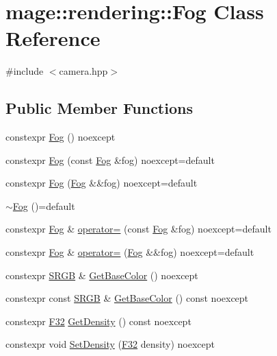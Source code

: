 \hypertarget{classmage_1_1rendering_1_1_fog}{}\section{mage\+:\+:rendering\+:\+:Fog Class Reference}
\label{classmage_1_1rendering_1_1_fog}


{\ttfamily \#include $<$camera.\+hpp$>$}

\subsection*{Public Member Functions}
\begin{DoxyCompactItemize}
\item 
constexpr \hyperlink{classmage_1_1rendering_1_1_fog_a48489b0ce940aff4395eb5ea88394081}{Fog} () noexcept
\item 
constexpr \hyperlink{classmage_1_1rendering_1_1_fog_a2f730d70ed426468f113d44e7810394b}{Fog} (const \hyperlink{classmage_1_1rendering_1_1_fog}{Fog} \&fog) noexcept=default
\item 
constexpr \hyperlink{classmage_1_1rendering_1_1_fog_aeed9b3fc18dabe37199c51ed7c4f5930}{Fog} (\hyperlink{classmage_1_1rendering_1_1_fog}{Fog} \&\&fog) noexcept=default
\item 
\hyperlink{classmage_1_1rendering_1_1_fog_a3dfb641a2c5688172e3c4be7c91631a2}{$\sim$\+Fog} ()=default
\item 
constexpr \hyperlink{classmage_1_1rendering_1_1_fog}{Fog} \& \hyperlink{classmage_1_1rendering_1_1_fog_a6197ad3df06e461c7cb2f5028f8cd901}{operator=} (const \hyperlink{classmage_1_1rendering_1_1_fog}{Fog} \&fog) noexcept=default
\item 
constexpr \hyperlink{classmage_1_1rendering_1_1_fog}{Fog} \& \hyperlink{classmage_1_1rendering_1_1_fog_ae0b197b983b73f78782fecfc491ddd1c}{operator=} (\hyperlink{classmage_1_1rendering_1_1_fog}{Fog} \&\&fog) noexcept=default
\item 
constexpr \hyperlink{structmage_1_1_s_r_g_b}{S\+R\+GB} \& \hyperlink{classmage_1_1rendering_1_1_fog_a514b3e11c7c3eb64b2b696278442eee6}{Get\+Base\+Color} () noexcept
\item 
constexpr const \hyperlink{structmage_1_1_s_r_g_b}{S\+R\+GB} \& \hyperlink{classmage_1_1rendering_1_1_fog_af8ab44c1cb0667ae4a439e2798f2e9e4}{Get\+Base\+Color} () const noexcept
\item 
constexpr \hyperlink{namespacemage_aa97e833b45f06d60a0a9c4fc22ae02c0}{F32} \hyperlink{classmage_1_1rendering_1_1_fog_ac99a5479a39027723807296c49fdfbc8}{Get\+Density} () const noexcept
\item 
constexpr void \hyperlink{classmage_1_1rendering_1_1_fog_a9b498c71c58e28bd58b09e4385338a13}{Set\+Density} (\hyperlink{namespacemage_aa97e833b45f06d60a0a9c4fc22ae02c0}{F32} density) noexcept
\end{DoxyCompactItemize}
